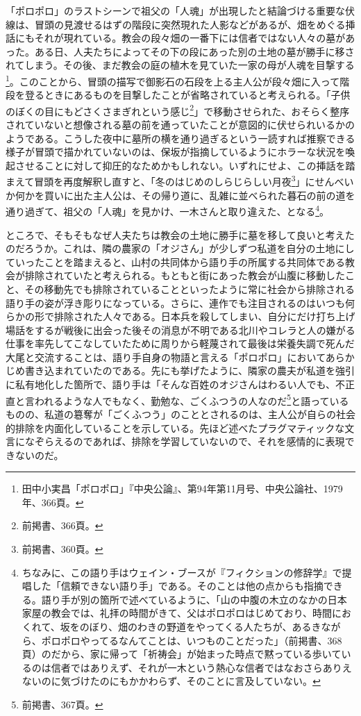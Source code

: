 「ポロポロ」のラストシーンで祖父の「人魂」が出現したと結論づける重要な伏線は、冒頭の見渡せるはずの階段に突然現れた人影などがあるが、畑をめぐる挿話にもそれが現れている。教会の段々畑の一番下には信者ではない人々の墓があった。ある日、人夫たちによってその下の段にあった別の土地の墓が勝手に移されてしまう。その後、まだ教会の庭の植木を見ていた一家の母が人魂を目撃する\footnote{田中小実昌「ポロポロ」『中央公論』、第94年第11月号、中央公論社、1979年、366頁。}。このことから、冒頭の描写で御影石の石段を上る主人公が段々畑に入って階段を登るときにあるものを目撃したことが省略されていると考えられる。「子供のぼくの目にもどさくさまぎれという感じ\footnote{前掲書、366頁。}」で移動させられた、おそらく整序されていないと想像される墓の前を通っていたことが意図的に伏せられいるかのようである。こうした夜中に墓所の横を通り過ぎるという一読すれば推察できる様子が冒頭で描かれていないのは、保坂が指摘しているようにホラーな状況を喚起させることに対して抑圧的なためかもしれない。いずれにせよ、この挿話を踏まえて冒頭を再度解釈し直すと、「冬のはじめのしらじらしい月夜\footnote{前掲書、360頁。}」にせんべいか何かを買いに出た主人公は、その帰り道に、乱雑に並べられた暮石の前の道を通り過ぎて、祖父の「人魂」を見かけ、一木さんと取り違えた、となる\footnote{ちなみに、この語り手はウェイン・ブースが『フィクションの修辞学』で提唱した「信頼できない語り手」である。そのことは他の点からも指摘できる。語り手が別の箇所で述べているように、「山の中腹の木立のなかの日本家屋の教会では、礼拝の時間がきて、父はポロポロはじめており、時間におくれて、坂をのぼり、畑のわきの野道をやってくる人たちが、あるきながら、ポロポロやってるなんてことは、いつものことだった」（前掲書、368頁）のだから、家に帰って「祈祷会」が始まった時点で黙っている歩いているのは信者ではありえず、それが一木という熱心な信者ではなおさらありえないのに気づけたのにもかかわらず、そのことに言及していない。}。

ところで、そもそもなぜ人夫たちは教会の土地に勝手に墓を移して良いと考えたのだろうか。これは、隣の農家の「オジさん」が少しずつ私道を自分の土地にしていったことを踏まえると、山村の共同体から語り手の所属する共同体である教会が排除されていたと考えられる。もともと街にあった教会が山腹に移動したこと、その移動先でも排除されていることといったように常に社会から排除される語り手の姿が浮き彫りになっている。さらに、連作でも注目されるのはいつも何らかの形で排除された人々である。日本兵を殺してしまい、自分にだけ打ち上げ場話をするが戦後に出会った後その消息が不明である北川やコレラと人の嫌がる仕事を率先してこなしていたために周りから軽蔑されて最後は栄養失調で死んだ大尾と交流することは、語り手自身の物語と言える「ポロポロ」においてあらかじめ書き込まれていたのである。先にも挙げたように、隣家の農夫が私道を強引に私有地化した箇所で、語り手は「そんな百姓のオジさんはわるい人でも、不正直と言われるような人でもなく、勤勉な、ごくふつうの人なのだ\footnote{前掲書、367頁。}と語っているものの、私道の簒奪が「ごくふつう」のこととされるのは、主人公が自らの社会的排除を内面化していることを示している。先ほど述べたプラグマティックな文言になぞらえるのであれば、排除を学習していないので、それを感情的に表現できないのだ。

